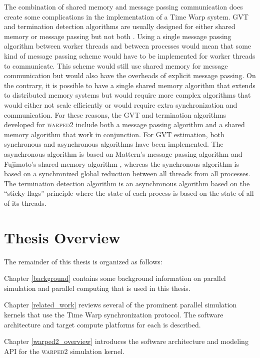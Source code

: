 \documentclass[11pt]{book}
\begin{document}
The combination of shared memory and message passing communication does create some complications in
the implementation of a Time Warp system.  GVT and termination detection algorithms are usually
designed for either shared memory or message passing but not both
\cite{mattern-93,bellenot-90,fujimoto-94,xaio-95}.  Using a single message passing algorithm between
worker threads and between processes would mean that some kind of message passing scheme would have
to be implemented for worker threads to communicate.  This scheme would still use shared memory for
message communication but would also have the overheads of explicit message passing.  On the
contrary, it is possible to have a single shared memory algorithm that extends to distributed memory
systems but would require more complex algorithms that would either not scale efficiently or would
require extra synchronization and communication.  For these reasons, the GVT and termination
algorithms developed for \textsc{warped2} include both a message passing algorithm and a shared
memory algorithm that work in conjunction.  For GVT estimation, both synchronous and asynchronous
algorithms have been implemented.  The asynchronous algorithm is based on Mattern's message passing
algorithm\cite{mattern-93} and Fujimoto's shared memory algorithm \cite{fujimoto-94}, whereas the
synchronous algorithm is based on a synchronized global reduction between all threads from all
processes.  The termination detection algorithm is an asynchronous algorithm based on the ``sticky
flags'' principle\cite{mattern-91} where the state of each process is based on the state of all of
its threads.

\section{Thesis Overview}

The remainder of this thesis is organized as follows:

Chapter \ref{background} contains some background information on parallel simulation and
parallel computing that is used in this thesis.

Chapter \ref{related_work} reviews several of the prominent parallel simulation kernels
that use the Time Warp synchronization protocol.  The software architecture and target
compute platforms for each is described.

Chapter \ref{warped2_overview} introduces the software architecture and modeling API for
the \textsc{warped2} simulation kernel.
\end{document}
